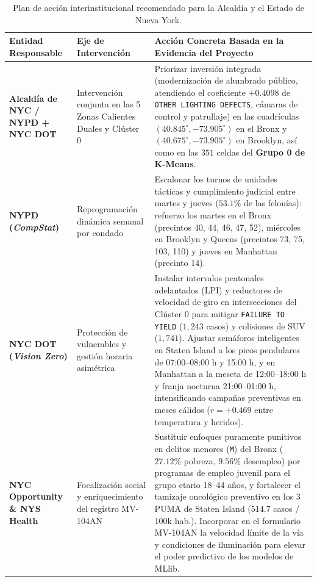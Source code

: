 \begin{table}[H]
\centering
\scriptsize
\renewcommand{\arraystretch}{1.3}
\caption{Plan de acción interinstitucional recomendado para la Alcaldía y el Estado de Nueva York.}
\label{tab:recomendaciones_ejecutivas}
\begin{tabularx}{\linewidth}{>{\raggedright\arraybackslash}p{2.7cm} >{\raggedright\arraybackslash}p{3.4cm} X}
\toprule
\textbf{Entidad Responsable} & \textbf{Eje de Intervención} & \textbf{Acción Concreta Basada en la Evidencia del Proyecto} \\
\midrule
\textbf{Alcaldía de NYC / NYPD + NYC DOT} & Intervención conjunta en las 5 Zonas Calientes Duales y Clúster 0 & Priorizar inversión integrada (modernización de alumbrado público, atendiendo el coeficiente $+0.4098$ de \texttt{OTHER LIGHTING DEFECTS}, cámaras de control y patrullaje) en las cuadrículas $(40.845^\circ, -73.905^\circ)$ en el Bronx y $(40.675^\circ, -73.905^\circ)$ en Brooklyn, así como en las $351$ celdas del \textbf{Grupo 0 de K-Means}. \\
\textbf{NYPD (\textit{CompStat})} & Reprogramación dinámica semanal por condado & Escalonar los turnos de unidades tácticas y cumplimiento judicial entre martes y jueves ($53.1\%$ de las felonías): refuerzo los martes en el Bronx (precintos 40, 44, 46, 47, 52), miércoles en Brooklyn y Queens (precintos 73, 75, 103, 110) y jueves en Manhattan (precinto 14). \\
\textbf{NYC DOT (\textit{Vision Zero})} & Protección de vulnerables y gestión horaria asimétrica & Instalar intervalos peatonales adelantados (LPI) y reductores de velocidad de giro en intersecciones del Clúster 0 para mitigar \texttt{FAILURE TO YIELD} ($1,243$ casos) y colisiones de SUV ($1,741$). Ajustar semáforos inteligentes en Staten Island a los picos pendulares de 07:00--08:00 h y 15:00 h, y en Manhattan a la meseta de 12:00--18:00 h y franja nocturna 21:00--01:00 h, intensificando campañas preventivas en meses cálidos ($r = +0.469$ entre temperatura y heridos). \\
\textbf{NYC Opportunity \& NYS Health} & Focalización social y enriquecimiento del registro MV-104AN & Sustituir enfoques puramente punitivos en delitos menores (\texttt{M}) del Bronx ($27.12\%$ pobreza, $9.56\%$ desempleo) por programas de empleo juvenil para el grupo etario 18--44 años, y fortalecer el tamizaje oncológico preventivo en los 3 PUMA de Staten Island ($514.7$ casos / 100k hab.). Incorporar en el formulario MV-104AN la velocidad límite de la vía y condiciones de iluminación para elevar el poder predictivo de los modelos de MLlib. \\
\bottomrule
\end{tabularx}
\end{table}
